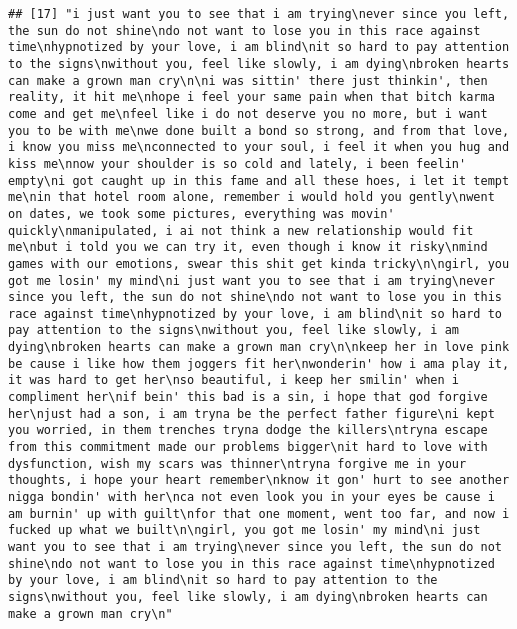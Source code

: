 \documentclass[]{article}
\begin{document}
\begin{verbatim}
## [17] "i just want you to see that i am trying\never since you left, the sun do not shine\ndo not want to lose you in this race against time\nhypnotized by your love, i am blind\nit so hard to pay attention to the signs\nwithout you, feel like slowly, i am dying\nbroken hearts can make a grown man cry\n\ni was sittin' there just thinkin', then reality, it hit me\nhope i feel your same pain when that bitch karma come and get me\nfeel like i do not deserve you no more, but i want you to be with me\nwe done built a bond so strong, and from that love, i know you miss me\nconnected to your soul, i feel it when you hug and kiss me\nnow your shoulder is so cold and lately, i been feelin' empty\ni got caught up in this fame and all these hoes, i let it tempt me\nin that hotel room alone, remember i would hold you gently\nwent on dates, we took some pictures, everything was movin' quickly\nmanipulated, i ai not think a new relationship would fit me\nbut i told you we can try it, even though i know it risky\nmind games with our emotions, swear this shit get kinda tricky\n\ngirl, you got me losin' my mind\ni just want you to see that i am trying\never since you left, the sun do not shine\ndo not want to lose you in this race against time\nhypnotized by your love, i am blind\nit so hard to pay attention to the signs\nwithout you, feel like slowly, i am dying\nbroken hearts can make a grown man cry\n\nkeep her in love pink be cause i like how them joggers fit her\nwonderin' how i ama play it, it was hard to get her\nso beautiful, i keep her smilin' when i compliment her\nif bein' this bad is a sin, i hope that god forgive her\njust had a son, i am tryna be the perfect father figure\ni kept you worried, in them trenches tryna dodge the killers\ntryna escape from this commitment made our problems bigger\nit hard to love with dysfunction, wish my scars was thinner\ntryna forgive me in your thoughts, i hope your heart remember\nknow it gon' hurt to see another nigga bondin' with her\nca not even look you in your eyes be cause i am burnin' up with guilt\nfor that one moment, went too far, and now i fucked up what we built\n\ngirl, you got me losin' my mind\ni just want you to see that i am trying\never since you left, the sun do not shine\ndo not want to lose you in this race against time\nhypnotized by your love, i am blind\nit so hard to pay attention to the signs\nwithout you, feel like slowly, i am dying\nbroken hearts can make a grown man cry\n"                                                                                                                                                                                                                                                                                                                                                                                                                                                                                                                                                                                                                                                                                                                                                                                                                                                                         
\end{verbatim}
\end{document}
